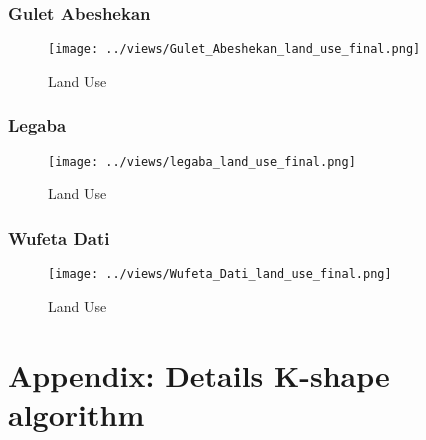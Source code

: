 \documentclass[10pt,a4paper,onecolumn]{article}
\begin{document}
\subsubsection{Gulet Abeshekan}


\begin{figure}[H] \centering
  \captionsetup{justification=centering}
\caption{Land Use} 
\centering


\texttt{[image: ../views/Gulet\_Abeshekan\_land\_use\_final.png]}

\end{figure}




\pagebreak


\subsubsection{Legaba}

\begin{figure}[H] \centering
  \captionsetup{justification=centering}
\caption{Land Use} 
\centering


\texttt{[image: ../views/legaba\_land\_use\_final.png]}

\end{figure}



\subsubsection{Wufeta Dati}


\begin{figure}[H] \centering
  \captionsetup{justification=centering}
\caption{Land Use} 
\centering


\texttt{[image: ../views/Wufeta\_Dati\_land\_use\_final.png]}

\end{figure}


\pagebreak
\appendix
\renewcommand{\theequation}{\Alph{chapter}.\arabic{equation}}

\setcounter{figure}{0}
\setcounter{table}{0}
\makeatletter 
\renewcommand{\thefigure}{A.\@arabic\c@figure}
\renewcommand{\thetable}{A.\@arabic\c@table}

\section{Appendix: Details K-shape algorithm}
\end{document}

